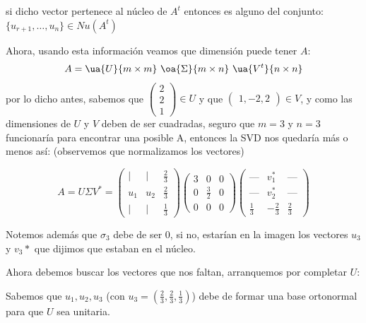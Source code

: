 si dicho vector pertenece al núcleo de $A^t$ entonces es alguno del conjunto: $\{u_{r+1}, \dots, u_n\} \in Nu(A^t)$

Ahora, usando esta información veamos que dimensión puede tener $A$:
$$
    A = \ua{U}{m\times m} \ \oa{\Sigma}{m \times n} \ \ua{V^t}{n \times n}
$$
por lo dicho antes, sabemos que $\begin{pmatrix} 2 \\ 2 \\ 1 \end{pmatrix} \in U$ y que $\begin{pmatrix} 1 , -2, 2 \end{pmatrix} \in V$, y como las dimensiones de $U$ y $V$ deben de ser cuadradas, seguro que $m = 3$ y $n =3$ funcionaría para encontrar una posible A, entonces la SVD nos quedaría más o menos así: (observemos que normalizamos los vectores)

$$
A = U \Sigma V^*
= \begin{pmatrix}
    \mid & \mid & \frac{2}{3} \\
    u_1 & u_2 & \frac{2}{3} \\
    \mid & \mid & \frac{1}{3}
    \end{pmatrix}
    \begin{pmatrix}
    3 & 0 & 0 \\
    0 & \frac{3}{2} & 0 \\
    0 & 0 & 0
    \end{pmatrix}
    \begin{pmatrix}
    \text{---} & v_1^* & \text{---} \\
    \text{---} & v_2^* & \text{---} \\
    \frac{1}{3} & -\frac{2}{3} & \frac{2}{3}
    \end{pmatrix}
$$

Notemos además que $\sigma_3$ debe de ser 0, si no, estarían en la imagen los vectores $u_3$ y $v_3*$ que dijimos que estaban en el núcleo.

Ahora debemos buscar los vectores que nos faltan, arranquemos por completar $U$:

Sabemos que $u_1, u_2, u_3$ (con $u_3 = (\frac{2}{3}, \frac{2}{3}, \frac{1}{3})$) debe de formar una base ortonormal para que $U$ sea unitaria.

